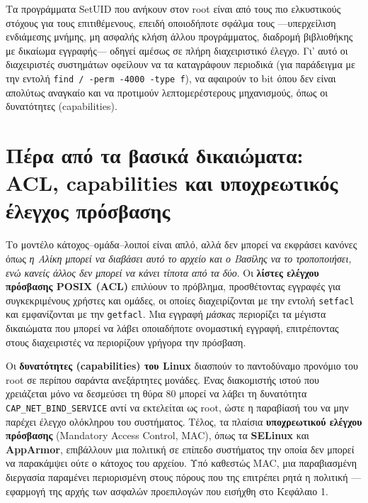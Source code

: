 \documentclass[11pt,openany]{book}
\begin{document}
Τα προγράμματα SetUID που ανήκουν στον root είναι από τους πιο ελκυστικούς στόχους για τους επιτιθέμενους, επειδή οποιοδήποτε σφάλμα τους —υπερχείλιση ενδιάμεσης μνήμης, μη ασφαλής κλήση άλλου προγράμματος, διαδρομή βιβλιοθήκης με δικαίωμα εγγραφής— οδηγεί αμέσως σε πλήρη διαχειριστικό έλεγχο. Γι' αυτό οι διαχειριστές συστημάτων οφείλουν να τα καταγράφουν περιοδικά (για παράδειγμα με την εντολή \texttt{find / -perm -4000 -type f}), να αφαιρούν το bit όπου δεν είναι απολύτως αναγκαίο και να προτιμούν λεπτομερέστερους μηχανισμούς, όπως οι δυνατότητες (capabilities).

\section{Πέρα από τα βασικά δικαιώματα: ACL, capabilities και υποχρεωτικός έλεγχος πρόσβασης}\label{sec:2.3}
Το μοντέλο κάτοχος–ομάδα–λοιποί είναι απλό, αλλά δεν μπορεί να εκφράσει κανόνες όπως \emph{η Αλίκη μπορεί να διαβάσει αυτό το αρχείο και ο Βασίλης να το τροποποιήσει, ενώ κανείς άλλος δεν μπορεί να κάνει τίποτα από τα δύο}. Οι \textbf{λίστες ελέγχου πρόσβασης POSIX (ACL)} επιλύουν το πρόβλημα, προσθέτοντας εγγραφές για συγκεκριμένους χρήστες και ομάδες, οι οποίες διαχειρίζονται με την εντολή \texttt{setfacl} και εμφανίζονται με την \texttt{getfacl}. Μια εγγραφή \emph{μάσκας} περιορίζει τα μέγιστα δικαιώματα που μπορεί να λάβει οποιαδήποτε ονομαστική εγγραφή, επιτρέποντας στους διαχειριστές να περιορίζουν γρήγορα την πρόσβαση.

Οι \textbf{δυνατότητες (capabilities) του Linux} διασπούν το παντοδύναμο προνόμιο του root σε περίπου σαράντα ανεξάρτητες μονάδες. Ένας διακομιστής ιστού που χρειάζεται μόνο να δεσμεύσει τη θύρα 80 μπορεί να λάβει τη δυνατότητα \texttt{CAP\_NET\_BIND\_SERVICE} αντί να εκτελείται ως root, ώστε η παραβίασή του να μην παρέχει έλεγχο ολόκληρου του συστήματος. Τέλος, τα πλαίσια \textbf{υποχρεωτικού ελέγχου πρόσβασης} (Mandatory Access Control, MAC), όπως τα \textbf{SELinux} και \textbf{AppArmor}, επιβάλλουν μια πολιτική σε επίπεδο συστήματος την οποία δεν μπορεί να παρακάμψει ούτε ο κάτοχος του αρχείου. Υπό καθεστώς MAC, μια παραβιασμένη διεργασία παραμένει περιορισμένη στους πόρους που της επιτρέπει ρητά η πολιτική —εφαρμογή της αρχής των ασφαλών προεπιλογών που εισήχθη στο Κεφάλαιο 1.
\end{document}
